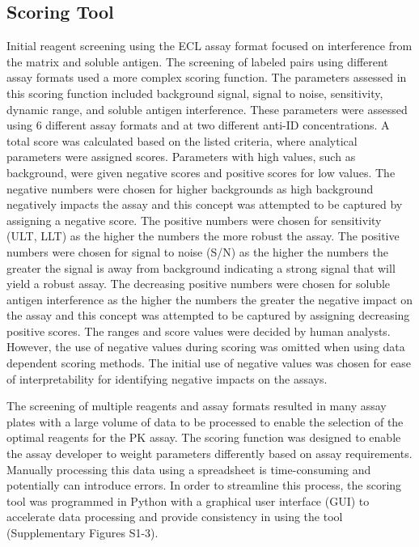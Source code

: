 \subsection{Scoring Tool}
Initial reagent screening using the ECL assay format focused on interference from the matrix and soluble antigen.  The screening of labeled pairs using different assay formats used a more complex scoring function.  The parameters assessed in this scoring function included background signal, signal to noise, sensitivity, dynamic range, and soluble antigen interference.  These parameters were assessed using 6 different assay formats and at two different anti-ID concentrations. A total score was calculated based on the listed criteria, where analytical parameters were assigned scores.  Parameters with high values, such as background, were given negative scores and positive scores for low values.  The negative numbers were chosen for higher backgrounds as high background negatively impacts the assay and this concept was attempted to be captured by assigning a negative score.  The positive numbers were chosen for sensitivity (ULT, LLT) as the higher the numbers the more robust the assay. The positive numbers were chosen for signal to noise (S/N) as the higher the numbers the greater the signal is away from background indicating a strong signal that will yield a robust assay. The decreasing positive numbers were chosen for soluble antigen interference as the higher the numbers the greater the negative impact on the assay and this concept was attempted to be captured by assigning decreasing positive scores. The ranges and score values were decided by human analysts. However, the use of negative values during scoring was omitted when using data dependent scoring methods.  The initial use of negative values was chosen for ease of interpretability for identifying negative impacts on the assays.

The screening of multiple reagents and assay formats resulted in many assay plates with a large volume of data to be processed to enable the selection of the optimal reagents for the PK assay.  The scoring function was designed to enable the assay developer to weight parameters differently based on assay requirements.  Manually processing this data using a spreadsheet is time-consuming and potentially can introduce errors.  In order to streamline this process, the scoring tool was programmed in Python with a graphical user interface (GUI) to accelerate data processing and provide consistency in using the tool (Supplementary Figures S1-3). 

